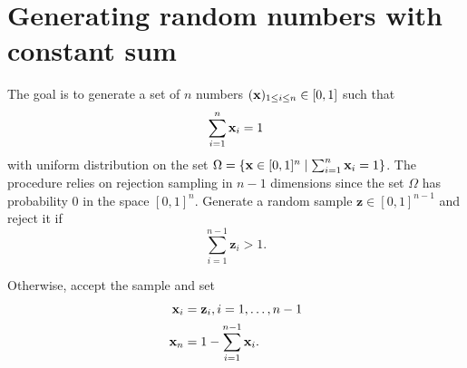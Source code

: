 \chapter{Generating random numbers with constant sum}\label{app:random_sum}

The goal is to generate a set of \(n\) numbers \((\mathbf{x})_{1 \leq i \leq n} \in [0, 1]\) such that
\begin{equation}
    \sum_{i=1}^{n} \mathbf{x}_i = 1
\end{equation}
with uniform distribution on the set \(\Omega = \{\mathbf{x} \in [0, 1]^n \mid \sum_{i=1}^{n} \mathbf{x}_i = 1 \}\). The procedure relies on rejection sampling in \(n-1\) dimensions since the set \(\Omega\) has probability 0 in the space \([0, 1]^n\). Generate a random sample \(\mathbf{z} \in [0, 1]^{n-1}\) and reject it if
\begin{equation}
    \sum_{i=1}^{n-1} \mathbf{z}_i > 1.
\end{equation}

Otherwise, accept the sample and set
\begin{align}
    \mathbf{x}_i &= \mathbf{z}_i, i = 1,\dots,n-1 \\
    \mathbf{x}_n &= 1 - \sum_{i=1}^{n-1} \mathbf{x}_i.
\end{align}